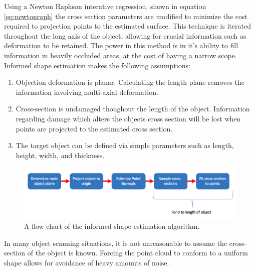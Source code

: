 \documentclass[12pt]{drexelthesis}
\begin{document}
Using a Newton Raphson interative regression, shown in equation \ref{eq:newtonraph} the cross section parameters are modified to minimize the cost required to projection points to the estimated surface. This technique is iterated throughout the long axis of the object, allowing for crucial information such as deformation to be retained. The power in this method is in it's ability to fill information in heavily occluded areas, at the cost of having a narrow scope. Informed shape estimation makes the following assumptions:

\begin{enumerate}
	\item Objection deformation is planar. Calculating the length plane removes the information involving multi-axial deformation.
	\item Cross-section is undamaged thoughout the length of the object. Information regarding damage which alters the objects cross section will be lost when points are projected to the estimated cross section.
	\item The target object can be defined via simple parameters such as length, height, width, and thickness.
\end{enumerate}

\begin{figure}[!ht]
	\centering
		\includegraphics[width=5in]{cross-section-estimation/flowchart.png}
	\caption[Flow chart of informed shape estimation algorithm]{\centering A flow chart of the informed shape estimation algorithm.}
\end{figure}

In many object scanning situations, it is not unreasonable to assume the cross-section of the object is known. Forcing the point cloud to conform to a uniform shape allows for avoidance of heavy amounts of noise.
\end{document}
